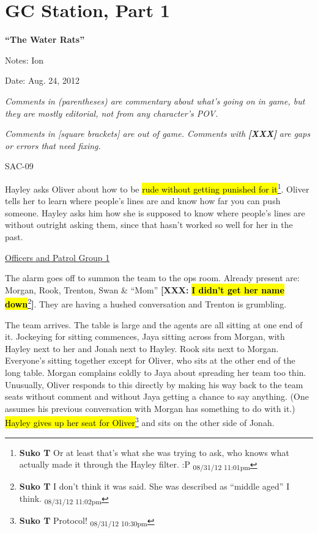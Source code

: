 \setcounter{chapter}{ 5 }
\chapter{GC Station, Part 1 }

\begin{center}
 {\LARGE \textbf{``The Water Rats''} } 
\end{center}




Notes: Ion

Date: Aug. 24, 2012



\textit{Comments in (parentheses) are commentary about what's going on in game, but they are mostly editorial, not from any character's POV.}

\textit{Comments in {[}square brackets{]} are out of game.  Comments with}\textit{\textbf{ {[}XXX{]}}}\textit{ are gaps or errors that need fixing.}



\noindent\hrulefill





 {\LARGE SAC-09 } 



Hayley asks Oliver about how to be \hl{rude without getting punished for it}\footnote{\textbf{Suko T }Or at least that's what she was trying to ask, who knows what actually made it through the Hayley filter. :P \textsubscript{08/31/12 11:01pm}}. Oliver tells her to learn where people's lines are and know how far you can push someone.  Hayley asks him how she is supposed to know where people's lines are without outright asking them, since that hasn't worked so well for her in the past.


\underline{ Officers and Patrol Group 1 }

The alarm goes off to summon the team to the ops room.  Already present are: Morgan, Rook, Trenton, Swan \& ``Mom''\textbf{ {[}XXX: }\textbf{\hl{I didn't get her name down}}\footnote{\textbf{Suko T }I don't think it was said. She was described as ``middle aged'' I think. \textsubscript{08/31/12 11:02pm}}\textbf{{]}}.\textbf{  }They are having a hushed conversation and Trenton is grumbling.



The team arrives.  The table is large and the agents are all sitting at one end of it.  Jockeying for sitting commences, Jaya sitting across from Morgan, with Hayley next to her and Jonah next to Hayley.  Rook sits next to Morgan.  Everyone's sitting together except for Oliver, who sits at the other end of the long table.  Morgan complains coldly to Jaya about spreading her team too thin.  Unusually, Oliver responds to this directly by making his way back to the team seats without comment and without Jaya getting a chance to say anything.  (One assumes his previous conversation with Morgan has something to do with it.)  \hl{Hayley gives up her seat for Oliver}\footnote{\textbf{Suko T }Protocol! \textsubscript{08/31/12 10:30pm}} and sits on the other side of Jonah.



